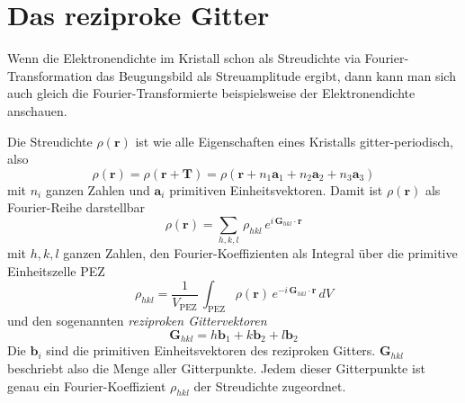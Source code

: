 \section{Das reziproke Gitter}
Wenn die Elektronendichte im Kristall schon als Streudichte via Fourier-Transformation das Beugungsbild als Streuamplitude ergibt, dann kann man sich auch gleich die Fourier-Transformierte beispielsweise der Elektronendichte anschauen.

Die Streudichte $\rho(\mathbf{r})$ ist wie alle Eigenschaften eines Kristalls gitter-periodisch, also 
\begin{equation}
  \rho(\mathbf{r}) = \rho(\mathbf{r} + \mathbf{T}) = \rho(\mathbf{r} + n_1 \mathbf{a}_1 + n_2 \mathbf{a}_2  + n_3 \mathbf{a}_3) 
\end{equation}
mit $n_i$ ganzen Zahlen und $\mathbf{a}_i$ primitiven Einheitsvektoren. Damit ist $\rho(\mathbf{r})$ als Fourier-Reihe darstellbar
\begin{equation}
  \rho(\mathbf{r}) = \sum_{h,k,l} \, \rho_{hkl} \, e^{i \, \mathbf{G}_{hkl} \cdot \mathbf{r}}
\end{equation}
mit $h,k,l$ ganzen Zahlen, den Fourier-Koeffizienten als Integral über die primitive Einheitszelle PEZ
\begin{equation}
\rho_{hkl} = \frac{1}{V_\text{PEZ}} \, \int_\text{PEZ}    \rho(\mathbf{r})\,  e^{-i \, \mathbf{G}_{hkl} \cdot \mathbf{r}} \, dV \label{eq:rezi_rho_hkl}
\end{equation}
und den sogenannten \emph{reziproken Gittervektoren}
\begin{equation}
\mathbf{G}_{hkl} = h \mathbf{b}_1 + k \mathbf{b}_2 + l \mathbf{b}_2 
\end{equation}
Die $\mathbf{b}_i$ sind die primitiven Einheitsvektoren des reziproken Gitters. $\mathbf{G}_{hkl}$ beschriebt also die Menge aller Gitterpunkte. Jedem dieser Gitterpunkte ist genau ein Fourier-Koeffizient $\rho_{hkl}$ der Streudichte zugeordnet. 

